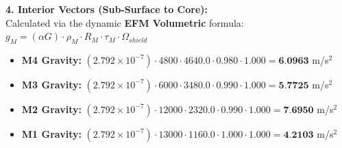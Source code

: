 \documentclass[11pt, a4paper]{article}
\begin{document}
  \vspace{0.5em}
  \noindent \textbf{4. Interior Vectors (Sub-Surface to Core):} \\[0.5em]
  \hspace*{1em} Calculated via the dynamic \textbf{EFM Volumetric} formula: $g_M = (\alpha G) \cdot \rho_{M} \cdot R_M \cdot \tau_M \cdot \Omega_{shield}$
  \begin{itemize}
    \item \textbf{M4 Gravity:} $(2.792 \times 10^{-7}) \cdot 4800 \cdot 4640.0 \cdot 0.980 \cdot 1.000 = \textbf{6.0963}$ m/s$^2$
    \item \textbf{M3 Gravity:} $(2.792 \times 10^{-7}) \cdot 6000 \cdot 3480.0 \cdot 0.990 \cdot 1.000 = \textbf{5.7725}$ m/s$^2$
    \item \textbf{M2 Gravity:} $(2.792 \times 10^{-7}) \cdot 12000 \cdot 2320.0 \cdot 0.990 \cdot 1.000 = \textbf{7.6950}$ m/s$^2$
    \item \textbf{M1 Gravity:} $(2.792 \times 10^{-7}) \cdot 13000 \cdot 1160.0 \cdot 1.000 \cdot 1.000 = \textbf{4.2103}$ m/s$^2$
  \end{itemize}
\end{document}
